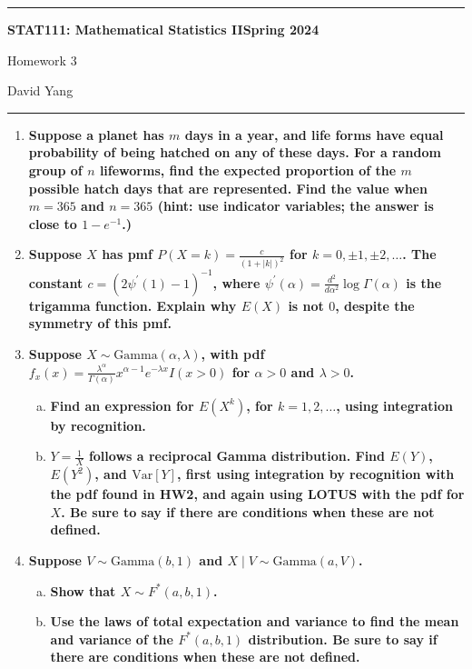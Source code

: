 \documentclass[11pt]{article}
\begin{document}
	\hrule
	\begin{center}
        \textbf{STAT111: Mathematical Statistics II}\hfill \textbf{Spring 2024}\newline

		{\Large Homework 3}

		David Yang
	\end{center}

\hrule

\vspace{1em}

\begin{enumerate}
    \item \textbf{Suppose a planet has $m$ days in a year, and life forms have equal probability of being hatched on any of these days. For a random group of $n$
    lifeworms, find the expected proportion of the $m$ possible hatch days that are represented. Find the value when $m = 365$ and $n = 365$ (hint: use indicator variables; the answer is close to $1 - e^{-1}$.)}

    \item \textbf{Suppose $X$ has pmf $P(X = k) = \frac{c}{(1+|k|)^2}$ for $k = 0, \pm 1, \pm 2, \dots$. The constant
    $c = (2\psi^{\prime}(1) - 1)^{-1}$, where $\psi^{\prime}(\alpha) = \frac{d^2}{d\alpha^2} \log \Gamma(\alpha)$ is the trigamma function.
    Explain why $E(X)$ is not $0$, despite the symmetry of this pmf.}
    
    \item \textbf{Suppose $X \sim \mathrm{Gamma}(\alpha, \lambda)$, with pdf $f_x(x) = \frac{\lambda^\alpha}{\Gamma(\alpha)}x^{\alpha - 1}e^{-\lambda x}I(x > 0)$ for $\alpha > 0$ and $\lambda > 0$.}
    
    \begin{enumerate}[a)]
      \item \textbf{Find an expression for $E(X^k)$, for $k = 1, 2, \dots$, using integration by recognition.}
      \item \textbf{$Y = \frac{1}{X}$ follows a reciprocal Gamma distribution. Find $E(Y)$, $E(Y^2)$, and $\mathrm{Var} \left[Y \right]$, first using integration by recognition with the pdf found in HW2, and again
      using LOTUS with the pdf for $X$. Be sure to say if there are conditions when these are not defined.}
    \end{enumerate}

    \item \textbf{Suppose $V \sim \mathrm{Gamma}(b, 1)$ and $X \mid V \sim \mathrm{Gamma}(a, V)$.}
    
    \begin{enumerate}[a)]
      \item \textbf{Show that $X \sim F^*(a, b, 1)$.}
      \item \textbf{Use the laws of total expectation and variance to find the mean and variance of the $F^*(a, b, 1)$ distribution. Be sure to say if there are conditions when these are not defined.}
    \end{enumerate}
\end{enumerate}
\end{document}
